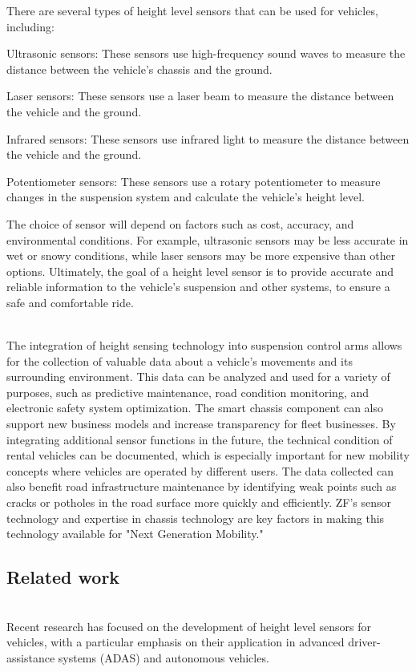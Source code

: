 \documentclass[11pt]{article}
\begin{document}
There are several types of height level sensors that can be used for vehicles, including:

Ultrasonic sensors: These sensors use high-frequency sound waves to measure the distance between the vehicle's chassis and the ground.

Laser sensors: These sensors use a laser beam to measure the distance between the vehicle and the ground.

Infrared sensors: These sensors use infrared light to measure the distance between the vehicle and the ground.

Potentiometer sensors: These sensors use a rotary potentiometer to measure changes in the suspension system and calculate the vehicle's height level.

The choice of sensor will depend on factors such as cost, accuracy, and environmental conditions. For example, ultrasonic sensors may be less accurate in wet or snowy conditions, while laser sensors may be more expensive than other options. Ultimately, the goal of a height level sensor is to provide accurate and reliable information to the vehicle's suspension and other systems, to ensure a safe and comfortable ride.

\indent \\The integration of height sensing technology into suspension control arms allows for the collection of valuable data about a vehicle's movements and its surrounding environment. This data can be analyzed and used for a variety of purposes, such as predictive maintenance, road condition monitoring, and electronic safety system optimization. The smart chassis component can also support new business models and increase transparency for fleet businesses. By integrating additional sensor functions in the future, the technical condition of rental vehicles can be documented, which is especially important for new mobility concepts where vehicles are operated by different users. The data collected can also benefit road infrastructure maintenance by identifying weak points such as cracks or potholes in the road surface more quickly and efficiently. ZF's sensor technology and expertise in chassis technology are key factors in making this technology available for "Next Generation Mobility."

\subsection{Related work}
\indent \\Recent research has focused on the development of height level sensors for vehicles, with a particular emphasis on their application in advanced driver-assistance systems (ADAS) and autonomous vehicles.
\end{document}
